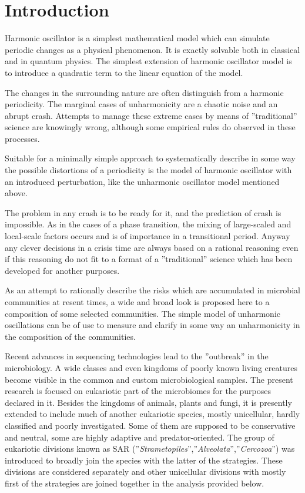 \documentclass[a4paper]{article}
\begin{document}
\section*{Introduction}

Harmonic oscillator is a simplest mathematical model which can simulate periodic changes as a physical phenomenon. It is exactly solvable both in classical and in quantum physics. The simplest extension of harmonic oscillator model is to introduce a quadratic term to the linear equation of the model. 

The changes in the surrounding nature are often distinguish from a harmonic periodicity. The marginal cases of unharmonicity are a chaotic noise and an abrupt crash. Attempts to manage these extreme cases by means of ''traditional'' science are knowingly wrong, although some empirical rules do observed in these processes.

Suitable for a minimally simple approach to systematically describe in some way the possible distortions of a periodicity is the model of harmonic oscillator with an introduced perturbation, like the unharmonic oscillator model mentioned above. 

The problem in any crash is to be ready for it, and the prediction of crash is impossible. As in the cases of a phase transition, the mixing of large-scaled and local-scale factors occurs and is of importance in a transitional period. Anyway any clever decisions in a crisis time are always based on a rational reasoning even if this reasoning do not fit to a format of a ''traditional'' science which has been developed for another purposes.

As an attempt to rationally describe the risks which are accumulated in microbial communities at resent times, a wide and broad look is proposed here to a composition of some selected communities. The simple model of unharmonic oscillations can be of use to measure and clarify in some way an unharmonicity in the composition of the communities.

Recent advances in sequencing technologies lead to the ''outbreak'' in the microbiology. A wide classes and even kingdoms of poorly known living creatures become visible in the common and custom microbiological samples. The present research is focused on eukariotic part of the microbiomes for the purposes declared in it. Besides the kingdoms of animals, plants and fungi, it is presently extended to include much of another eukariotic species, mostly unicellular, hardly classified and poorly investigated. Some of them are supposed to be conservative and neutral, some are highly adaptive and predator-oriented. The group of eukariotic divisions known as SAR (''\textit{Strametopiles}'',''\textit{Alveolata}'',''\textit{Cercozoa}'') was introduced to broadly join the species with the latter of the strategies. These divisions are considered separately and other unicellular divisions with mostly first of the strategies are joined together in the analysis provided below.
\end{document}
